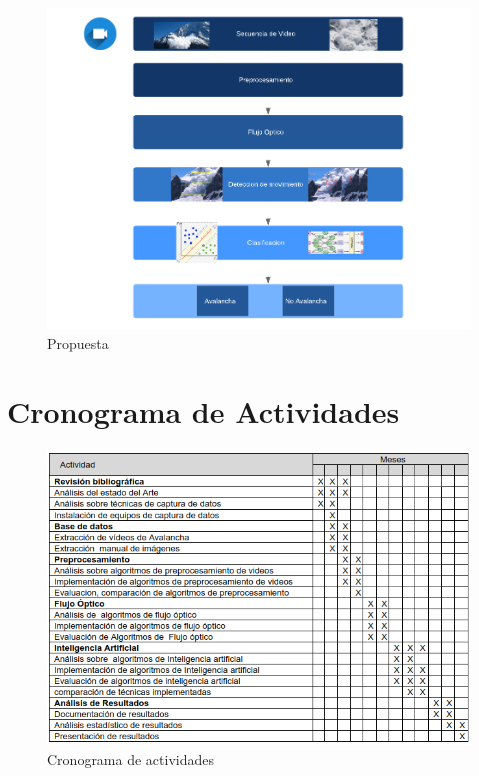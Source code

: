 \documentclass[a4paper,11pt]{report}
\begin{document}
\begin{figure}[h]
	\centering
	\includegraphics[scale=1.1]{propuesta}
	\caption{Propuesta}
	\label{fig:Propuesta }
\end{figure}




\chapter{Cronograma de Actividades}

\begin{figure}[h]
	\centering
	\includegraphics[scale=0.7]{cronograma}
	\caption{Cronograma de actividades}
	\label{fig:Cronograma }
\end{figure}



%



\vspace{1cm}
\end{document}
